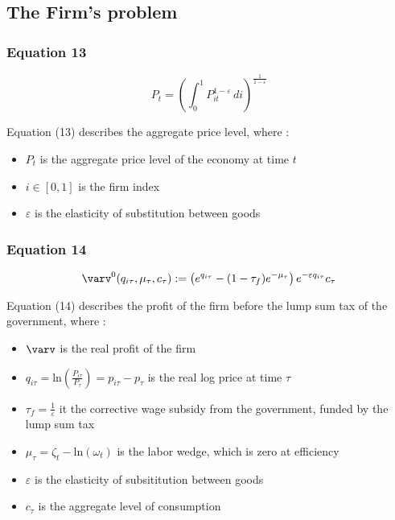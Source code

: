 \documentclass{article}
\begin{document}
\subsection{The Firm's problem}

\subsubsection*{Equation 13}
\begin{equation}
    P_{t}=\left(\int_{0}^{1}P_{it}^{1-\varepsilon}\,di\right)^{\frac{1}{1-\varepsilon}}
\end{equation}

Equation (13) describes the aggregate price level, where : 
\begin{itemize}
    \item $P_{t}$ is the aggregate price level of the economy at time $t$
    \item $i\in\left[0,1\right]$ is the firm index
    \item $\varepsilon$ is the elasticity of substitution between goods
\end{itemize}

\subsubsection*{Equation 14}
\begin{equation}
    \varv^{0}(q_{i\tau},\mu_{\tau},c_{\tau}):=\left(e^{q_{i\tau}}-(1-\tau_{f})e^{-\mu_{\tau}}\right)e^{-\varepsilon q_{i\tau}}c_{\tau}
\end{equation}

Equation (14) describes the profit of the firm before the lump sum tax of the government, where : 
\begin{itemize}
    \item $\varv$ is the real profit of the firm
    \item $q_{i\tau}=\text{ln}\left(\frac{P_{i\tau}}{P_{\tau}}\right)=p_{i\tau}-p_{\tau}$ is the real log price at time $\tau$
    \item $\tau_f=\frac{1}{\varepsilon}$ it the corrective wage subsidy from the government, funded by the lump sum tax
    \item $\mu_{\tau}=\zeta_{t}-\text{ln}(\omega_{t})$ is the labor wedge, which is zero at efficiency
    \item $\varepsilon$ is the elasticity of subsititution between goods
    \item $c_{\tau}$ is the aggregate level of consumption
\end{itemize}
\end{document}

